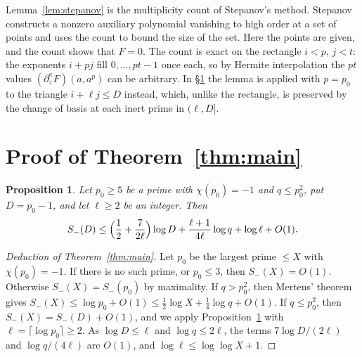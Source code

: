 \documentclass[11pt]{amsart}
\newtheorem{proposition}[theorem]{Proposition}
\theoremstyle{remark}
\begin{document}
Lemma~\ref{lem:stepanov} is the multiplicity count of Stepanov's method. Stepanov
constructs a nonzero auxiliary polynomial vanishing to high order at a set of points and uses the count to bound
the size of the set. Here the points are given, and the count shows that $F=0$. The count is exact on the rectangle $i<p$, $j<t$: the exponents
$i+pj$ fill $0,\dots,pt-1$ once each, so by Hermite interpolation the $pt$ values
$(\partial_z^\kappa F)(a,a^p)$ can be arbitrary. In \S\ref{sec:main} the lemma is applied
with $p=p_0$ to the triangle $i+\ell j\le D$ instead, which, unlike the rectangle, is preserved by the change
of basis at each inert prime in $(\ell,D]$.

\section{Proof of Theorem~\ref{thm:main}}\label{sec:main}

\begin{proposition}\label{prop:ell}
Let $p_0\ge5$ be a prime with $\chi(p_0)=-1$ and $q\le p_0^2$, put $D=p_0-1$, and let $\ell\ge2$ be
an integer. Then
\[
S_-(D)\le\Bigl(\frac12+\frac{7}{2\ell}\Bigr)\log D+\frac{\ell+1}{4\ell}\log q+\log\ell+O(1).
\]
\end{proposition}

\begin{proof}[Deduction of Theorem~\ref{thm:main}]
Let $p_0$ be the largest prime $\le X$ with $\chi(p_0)=-1$. If there is no such prime, or $p_0\le3$,
then $S_-(X)=O(1)$. Otherwise $S_-(X)=S_-(p_0)$ by maximality. If $q>p_0^2$, then Mertens' theorem gives
$S_-(X)\le\log p_0+O(1)\le\frac12\log X+\frac14\log q+O(1)$. If $q\le p_0^2$, then $S_-(X)=S_-(D)+O(1)$, and we apply
Proposition~\ref{prop:ell} with $\ell=\lceil\log p_0\rceil\ge2$. As $\log D\le\ell$ and
$\log q\le2\ell$, the terms $7\log D/(2\ell)$ and $\log q/(4\ell)$ are $O(1)$, and
$\log\ell\le\log\log X+1$.
\end{proof}
\end{document}
